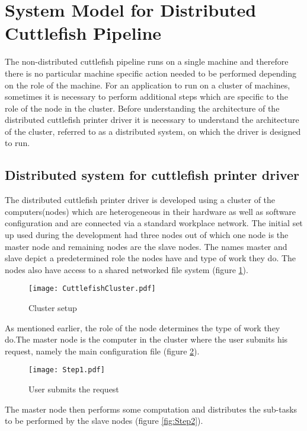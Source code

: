 \section{System Model for Distributed Cuttlefish Pipeline} \label{sysMod}

The non-distributed cuttlefish pipeline runs on a single machine and therefore there is no particular machine specific action needed to be performed depending on the role of the machine. For an application to run on a cluster of machines, sometimes it is necessary to perform additional steps which are specific to the role of the node in the cluster. Before understanding the architecture of the distributed cuttlefish printer driver it is necessary to understand the architecture of the cluster, referred to as a distributed system, on which the driver is designed to run. 

\subsection{Distributed system for cuttlefish printer driver} \label{clusterArch}

The distributed cuttlefish printer driver is developed using a cluster of the computers(nodes) which are heterogeneous in their hardware as well as software configuration and are connected via a standard workplace network. The initial set up used during the development had three nodes out of which one node is the master node and remaining nodes are the slave nodes. The names master and slave depict a predetermined role the nodes have and type of work they do. The nodes also have access to a shared networked file system (figure \ref{fig:CuttlefishCluster}).

\begin{figure}[ht!]
\centering
\texttt{[image: CuttlefishCluster.pdf]}
\caption{Cluster setup}
\label{fig:CuttlefishCluster}
\end{figure}

As mentioned earlier, the role of the node determines the type of work they do.The master node is the computer in the cluster where the user submits his request, namely the main configuration file (figure \ref{fig:Step1}). 

\begin{figure}[ht!]
\centering
\texttt{[image: Step1.pdf]}
\caption{User submits the request}
\label{fig:Step1}
\end{figure}

The master node then performs some computation and distributes the sub-tasks to be performed by the slave nodes (figure \ref{fig:Step2}). 


